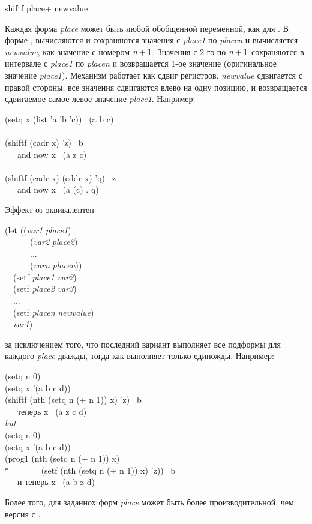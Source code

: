 \begin{defmac}
shiftf {place}+ newvalue

Каждая форма \emph{place} может быть любой обобщенной переменной, как для
. 
В форме , вычисляются и сохраняются значения с \emph{place1} по
\emph{placen} и вычисляется \emph{newvalue}, как значение с номером $\emph{n}+1$.
Значения с 2-го по $\emph{n}+1$ сохраняются в интервале с \emph{place1} по
\emph{placen} и возвращается 1-ое значение (оригинальное значение \emph{place1}).
Механизм работает как сдвиг регистров. \emph{newvalue} сдвигается с правой
стороны, все значения сдвигаются влево на одну позицию, и возвращается
сдвигаемое самое левое значение \emph{place1}. Например:
\begin{lisp}
(setq x (list 'a 'b 'c)) \EV\ (a b c) \\
 \\
(shiftf (cadr x) 'z) \EV\ b \\
~~~\textrm{and now} x \EV\ (a z c) \\
 \\
(shiftf (cadr x) (cddr x) 'q) \EV\ z \\
~~~\textrm{and now} x \EV\ (a (c) . q)
\end{lisp}
Эффект от  эквивалентен
\begin{lisp}
(let ((\emph{var1} \emph{place1}) \\
~~~~~~(\emph{var2} \emph{place2}) \\
~~~~~~... \\
~~~~~~(\emph{varn} \emph{placen})) \\
~~(setf \emph{place1} \emph{var2}) \\
~~(setf \emph{place2} \emph{var3}) \\
~~... \\
~~(setf \emph{placen} \emph{newvalue}) \\
~~\emph{var1})
\end{lisp}
за исключением того, что последний вариант выполняет все подформы для каждого
\emph{place} дважды, тогда как  выполняет только единожды.
Например:
\begin{lisp}
(setq n 0) \\
(setq x '(a b c d)) \\
(shiftf (nth (setq n (+ n 1)) x) 'z) \EV\ b \\
~~~\textrm{теперь} x \EV\ (a z c d) \\[4pt]
\emph{but} \\[4pt]
(setq n 0) \\
(setq x '(a b c d)) \\
(prog1 (nth (setq n (+ n 1)) x) \\*
~~~~~~~(setf (nth (setq n (+ n 1)) x) 'z)) \EV\ b \\
~~~\textrm{и теперь} x \EV\ (a b z d)
\end{lisp}
Более того, для заданнох форм \emph{place}  может быть более
производительной, чем версия с .
\end{defmac}


